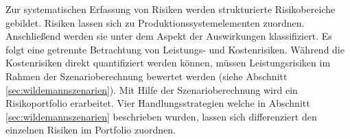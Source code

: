Zur systematischen Erfassung von Risiken werden strukturierte Risikobereiche gebildet. Risiken lassen sich zu Produktionssystemelementen zuordnen. Anschließend werden sie unter dem Aspekt der Auswirkungen klassifiziert. Es folgt eine getrennte Betrachtung von Leistungs- und Kostenrisiken. 
Während die Kostenrisiken direkt quantifiziert werden können, müssen Leistungsrisiken im Rahmen der Szenarioberechnung bewertet werden (siehe Abschnitt \ref{sec:wildemannszenarien}).
Mit Hilfe der Szenarioberechnung wird ein Risikoportfolio erarbeitet. Vier Handlungsstrategien welche in Abschnitt  \ref{sec:wildemannszenarien} beschrieben wurden, lassen sich differenziert den einzelnen Risiken im Portfolio zuordnen.